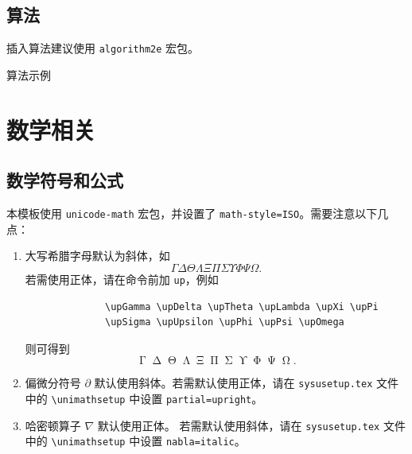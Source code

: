 \subsection{算法}

插入算法建议使用 \verb|algorithm2e| 宏包。
\vspace{.5\baselineskip}

\begin{algorithm}[H]
	\caption{算法示例}
	\label{algo:algorithm1}
\end{algorithm}

\section{数学相关}

\subsection{数学符号和公式}

本模板使用 \verb|unicode-math| 宏包，并设置了 \verb|math-style=ISO|。需要注意以下几点：

\begin{enumerate}
	\item 大写希腊字母默认为斜体，如
	      \begin{equation*}
		      \Gamma \Delta \Theta \Lambda \Xi \Pi \Sigma \Upsilon \Phi \Psi \Omega.
	      \end{equation*}
	      若需使用正体，请在命令前加 \verb|up|，例如
	      \begin{verbatim}
              \upGamma \upDelta \upTheta \upLambda \upXi \upPi
              \upSigma \upUpsilon \upPhi \upPsi \upOmega
          \end{verbatim}
	      则可得到
	      \begin{equation*}
		      \upGamma \upDelta \upTheta \upLambda \upXi \upPi \upSigma \upUpsilon \upPhi \upPsi \upOmega.
	      \end{equation*}
	\item 偏微分符号 $\partial$ 默认使用斜体。若需默认使用正体，请在 \texttt{sysusetup.tex} 文件中的 \verb|\unimathsetup| 中设置 \verb|partial=upright|。
	\item 哈密顿算子 $\nabla$ 默认使用正体。
	      若需默认使用斜体，请在 \texttt{sysusetup.tex} 文件中的 \verb|\unimathsetup| 中设置 \verb|nabla=italic|。
\end{enumerate}

